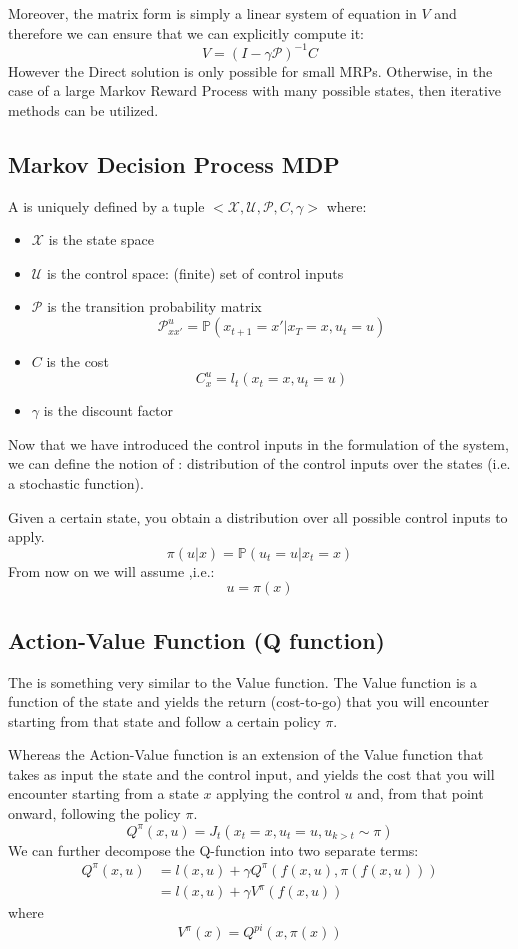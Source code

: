 Moreover, the matrix form is simply a linear system of equation in $V$ and therefore we can ensure that we can explicitly compute it:
\[V=(I-\gamma \mathcal{P})^{-1}C\]
However the Direct solution is only possible for small MRPs. Otherwise, in the case of a large Markov Reward Process with many possible states, then iterative methods can be utilized.

\subsection{Markov Decision Process MDP}
A  is uniquely defined by a tuple $<\mathcal{X}, \mathcal{U}, \mathcal{P},C, \gamma>$
where:
\begin{itemize}
\item $\mathcal{X}$ is the state space
\item $\mathcal{U}$ is the control space: (finite) set of control inputs
\item $\mathcal{P}$ is the transition probability matrix
\[\mathcal{P}_{xx'}^u = \mathbb{P}(x_{t+1}=x'|x_T=x, u_t = u)\]
\item $C$ is the cost
\[C_x^u = l_t(x_t=x, u_t=u)\]
\item $\gamma$ is the discount factor
\end{itemize}
 Now that we have introduced the control inputs in the formulation of the system, we can define the notion of : distribution of the control inputs over the states (i.e. a stochastic function).
 
 Given a certain state, you obtain a distribution over all possible control inputs to apply.
 \[\pi(u|x) = \mathbb{P}(u_t=u|x_t=x)\]
 From now on we will assume ,i.e.:
 \[u = \pi(x)\]

\subsection{Action-Value Function (Q function)}
The  is something very similar to the Value function. The Value function is a function of the state and yields the return (cost-to-go) that you will encounter starting from that state and follow a certain policy $\pi$.

Whereas the Action-Value function is an extension of the Value function that takes as input the state and the control input, and yields the cost that you will encounter starting from a state $x$ applying the control $u$ and, from that point onward, following the policy $\pi$.
\[Q^{\pi}(x,u) = J_t(x_t=x, u_t=u, u_{k>t}\sim \pi)\]
We can further decompose the Q-function into two separate terms:
\begin{align*}
Q^{\pi}(x,u) &= l(x,u) + \gamma Q^{\pi}(f(x,u), \pi(f(x,u)))\\
&= l(x,u) + \gamma V^{\pi}(f(x,u))
\end{align*}
where
\[V^{\pi}(x) = Q^{pi}(x,\pi(x))\]

